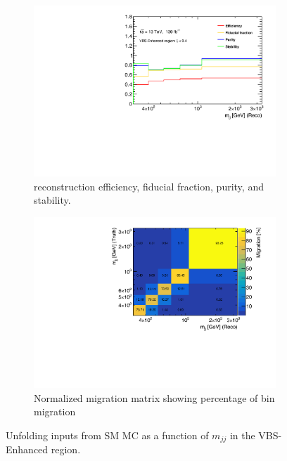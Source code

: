 \begin{figure}[htb]
    \centering
    \begin{subfigure}{.48\textwidth}
        \centering
        \includegraphics[width=.9\linewidth]{figures/Analysis/Unfolding/efficiencies_VBS_Enhanced.pdf}
        \caption{ reconstruction efficiency, fiducial fraction, purity, and stability. \label{fig:UI_mjj} }
    \end{subfigure}
    \begin{subfigure}{.48\textwidth}
        \centering
        \includegraphics[width=.9\linewidth]{figures/Analysis/Unfolding/migration_matrix_VBS_Enhanced.pdf}
        \caption{Normalized migration matrix showing percentage of bin migration \label{fig:MigMatrix}}
    \end{subfigure}
    \caption{ Unfolding inputs from SM MC as a function of $m_{jj}$ in the VBS-Enhanced region. \label{fig:UnfoldingInputs}}
\end{figure}

